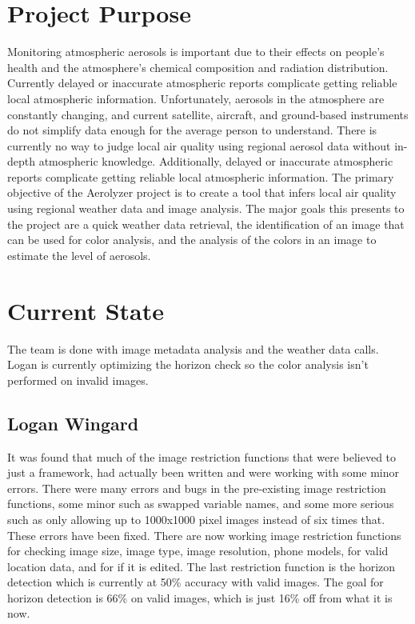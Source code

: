 \documentclass[onecolumn, draftclsnofoot,10pt, compsoc]{IEEEtran}
\begin{document}
\tableofcontents
\clearpage

\begin{singlespace}

	\section{Project Purpose}
		Monitoring atmospheric aerosols is important due to their effects on people’s health and the atmosphere's chemical composition and radiation distribution.
		Currently delayed or inaccurate atmospheric reports complicate getting reliable local atmospheric information.
		Unfortunately, aerosols in the atmosphere are constantly changing, and current satellite, aircraft, and ground-based instruments do not simplify data enough for the average person to understand.
		There is currently no way to judge local air quality using regional aerosol data without in-depth atmospheric knowledge.
		Additionally, delayed or inaccurate atmospheric reports complicate getting reliable local atmospheric information.
		The primary objective of the Aerolyzer project is to create a tool that infers local air quality using regional weather data and image analysis.
		The major goals this presents to the project are a quick weather data retrieval, the identification of an image that can be used for color analysis, and the analysis of the colors in an image to estimate the level of aerosols.
	
	\section{Current State}
		The team is done with image metadata analysis and the weather data calls.
		Logan is currently optimizing the horizon check so the color analysis isn't performed on invalid images.
		\subsection{Logan Wingard}
			It was found that much of the image restriction functions that were believed to just a framework, had actually been written and were working with some minor errors.
			There were many errors and bugs in the pre-existing image restriction functions, some minor such as swapped variable names, and some more serious such as only allowing up to 1000x1000 pixel images instead of six times that.
			These errors have been fixed.
			There are now working image restriction functions for checking image size, image type, image resolution, phone models, for valid location data, and for if it is edited.
			The last restriction function is the horizon detection which is currently at 50\% accuracy with valid images.
			The goal for horizon detection is 66\% on valid images, which is just 16\% off from what it is now.

\end{singlespace}
\end{document}
